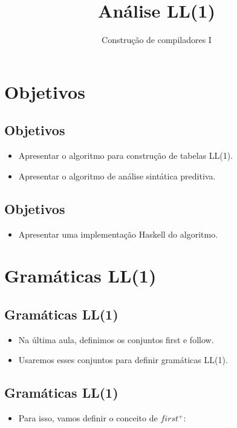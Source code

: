 \documentclass[11pt]{article}
\author{Construção de compiladores I}
\date{}
\title{Análise LL(1)}
\begin{document}
\maketitle
\section*{Objetivos}
\label{sec:org8905e4e}

\subsection*{Objetivos}
\label{sec:orga9fffec}

\begin{itemize}
\item Apresentar o algoritmo para construção de tabelas LL(1).

\item Apresentar o algoritmo de análise sintática preditiva.
\end{itemize}
\subsection*{Objetivos}
\label{sec:orgd0856f9}

\begin{itemize}
\item Apresentar uma implementação Haskell do algoritmo.
\end{itemize}
\section*{Gramáticas LL(1)}
\label{sec:org72f3795}

\subsection*{Gramáticas LL(1)}
\label{sec:org8d5e732}

\begin{itemize}
\item Na última aula, definimos os conjuntos first e follow.

\item Usaremos esses conjuntos para definir gramáticas LL(1).
\end{itemize}
\subsection*{Gramáticas LL(1)}
\label{sec:org252a2d5}

\begin{itemize}
\item Para isso, vamos definir o conceito de \(first^{+}\):
\end{itemize}
\end{document}
